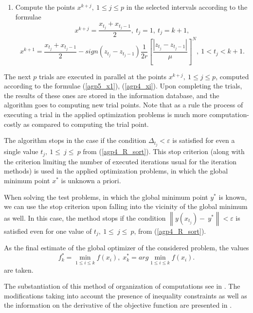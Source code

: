 \documentclass{svproc}
\begin{document}
\begin{enumerate}
	\item Compute the points $x^{k+j},\ 1\leq j\leq p$ in the selected intervals according to the formulae
\begin{equation}
	\label{agp5_x1}
	x^{k+j}=\frac{x_{t_j}+x_{t_j-1}}{2},\ t_j=1,\ t_j=k+1,
\end{equation}	
\begin{equation}
	\label{agp4_xi}	
	x^{k+1}=\frac{x_{t_j}+x_{t_j-1}}{2}-sign\left(z_{t_j}-z_{t_j-1}\right)\frac{1}{2r}\left[\frac{\left|z_{t_j}-z_{t_j-1}\right|}{\mu}\right]^N,\ 1<t_j<k+1.
\end{equation}
	
\end{enumerate}

The next $p$ trials are executed in parallel at the points $x^{k+j},\ 1\leq j\leq p$, computed according  to the formulae (\ref{agp5_x1}), (\ref{agp4_xi}). Upon completing the trials, the results of these ones  are stored in the information database, and the algorithm goes to computing new trial points.
Note that as a rule the process of executing a trial in the applied optimization problems is much more  computation-costly as compared to computing the trial point.

The algorithm stops in the case if the condition \(\Delta_{t_j} < \varepsilon\) is satisfied for even a  single value $t_j,\ 1\le\ j\le\ p$ from (\ref{agp4_R_sort}). This stop criterion (along with the criterion limiting the number of executed iterations usual for the  iteration methods) is used in the applied optimization problems, in which the global minimum point $x^*$ is unknown a priori. 

When solving the test problems, in which the global minimum point $y^*$ is known, we can use the stop criterion upon falling into the vicinity of the global minimum as well. In this case, the method  stops if the condition $\left\|y(x_{t_j})-\ y^\ast\right\| < \varepsilon$ is satisfied even for one value of $t_j,\  1\le\ j\le\ p$, from (\ref{agp4_R_sort}). 

As the final estimate of the global optimizer of the considered problem, the values 
\begin{equation} 
	f_k^*=\min_{1\leq i \leq k}f(x_i), \; x_k^*=arg \min_{1\leq i \leq k}f(x_i). 
\end{equation} 
are taken. 

The substantiation of this method of organization of computations see in \cite{Strongin2000,Barkalov2016}. The  modifications taking into account the presence of inequality constraints as well as the information on the derivative of the objective function are presented in \cite{Barkalov2002,Gergel1997}.
\end{document}

